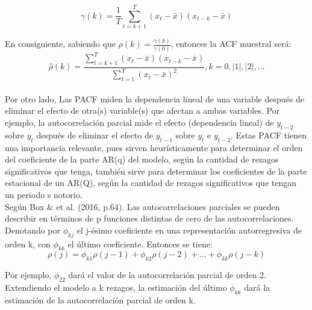 \documentclass{report}
\begin{document}
\begin{equation}
    \gamma (k)=\frac{1}{T}\sum_{t=k+1}^{T}(x_{t}-\bar{x})(x_{t-k}-\bar{x})
\end{equation}

En consiguiente, sabiendo que $\rho (k)= \frac{\gamma (k)}{\gamma (0)}$, entonces la ACF muestral será:\\
\begin{equation}
    \hat{\rho} (k)=\frac{\sum_{t=k+1}^{T}(x_{t}-\bar{x})(x_{t-k}-\bar{x})}{\sum_{t=1}^{T}(x_{t}-\bar{x})^{2}}, k=0, |1|, |2|,...
\end{equation}\\

Por otro lado, Las PACF miden la dependencia lineal de una variable después de eliminar el efecto de otra(s) variable(s) que afectan a ambas variables. Por ejemplo, la autocorrelación parcial mide el efecto (dependencia lineal) de $y_{t-2}$ sobre $y_{t}$ después de eliminar el efecto de $y_{t-1}$ sobre $y_{t}$ e $y_{t-2}$. Estas PACF tienen una importancia relevante, pues sirven heurísticamente para determinar el orden del coeficiente de la parte AR(q) del modelo, según la cantidad de rezagos significativos que tenga, también sirve para determinar los coeficientes de la parte estacional de un AR(Q), según la cantidad de rezagos significativos que tengan un periodo s notorio.\\

Según Box \& et al. (2016, p.64). Las autocorrelaciones parciales se pueden describir en términos de p funciones distintas de cero de las autocorrelaciones. Denotando por $\phi_{kj}$ el j-ésimo coeficiente en una representación autorregresiva de orden k, con $\phi_{kk}$ el último coeficiente. Entonces se tiene:\\

\begin{equation}
    \rho (j)=\phi_{k1}\rho(j-1)+ \phi_{k2}\rho(j-2)+...+\phi_{kk}\rho(j-k)
\end{equation}

Por ejemplo, $\phi_{22}$ dará el valor de la autocorrelación parcial de orden 2. Extendiendo el modelo a k rezagos, la estimación del último $\phi_{kk}$ dará la estimación de la autocorrelación parcial de orden k.\\
\end{document}
